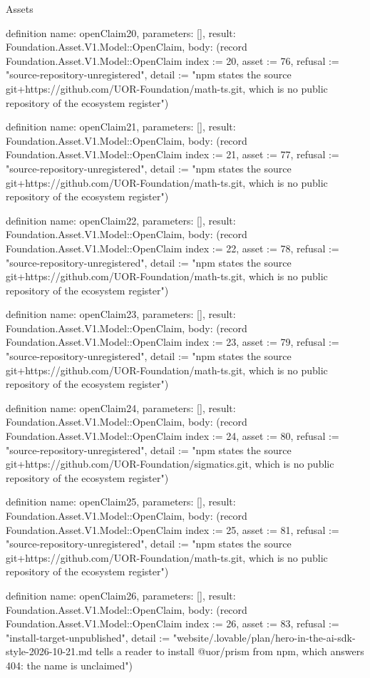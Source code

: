 \begin{lexlean}{Assets}
\begin{semanticmodule}
definition{
  name: openClaim20,
  parameters: [],
  result: Foundation.Asset.V1.Model::OpenClaim,
  body: (record Foundation.Asset.V1.Model::OpenClaim {index := 20, asset := 76, refusal := "source-repository-unregistered", detail := "npm states the source git+https://github.com/UOR-Foundation/math-ts.git, which is no public repository of the ecosystem register"})
}

definition{
  name: openClaim21,
  parameters: [],
  result: Foundation.Asset.V1.Model::OpenClaim,
  body: (record Foundation.Asset.V1.Model::OpenClaim {index := 21, asset := 77, refusal := "source-repository-unregistered", detail := "npm states the source git+https://github.com/UOR-Foundation/math-ts.git, which is no public repository of the ecosystem register"})
}

definition{
  name: openClaim22,
  parameters: [],
  result: Foundation.Asset.V1.Model::OpenClaim,
  body: (record Foundation.Asset.V1.Model::OpenClaim {index := 22, asset := 78, refusal := "source-repository-unregistered", detail := "npm states the source git+https://github.com/UOR-Foundation/math-ts.git, which is no public repository of the ecosystem register"})
}

definition{
  name: openClaim23,
  parameters: [],
  result: Foundation.Asset.V1.Model::OpenClaim,
  body: (record Foundation.Asset.V1.Model::OpenClaim {index := 23, asset := 79, refusal := "source-repository-unregistered", detail := "npm states the source git+https://github.com/UOR-Foundation/math-ts.git, which is no public repository of the ecosystem register"})
}

definition{
  name: openClaim24,
  parameters: [],
  result: Foundation.Asset.V1.Model::OpenClaim,
  body: (record Foundation.Asset.V1.Model::OpenClaim {index := 24, asset := 80, refusal := "source-repository-unregistered", detail := "npm states the source git+https://github.com/UOR-Foundation/sigmatics.git, which is no public repository of the ecosystem register"})
}

definition{
  name: openClaim25,
  parameters: [],
  result: Foundation.Asset.V1.Model::OpenClaim,
  body: (record Foundation.Asset.V1.Model::OpenClaim {index := 25, asset := 81, refusal := "source-repository-unregistered", detail := "npm states the source git+https://github.com/UOR-Foundation/math-ts.git, which is no public repository of the ecosystem register"})
}

definition{
  name: openClaim26,
  parameters: [],
  result: Foundation.Asset.V1.Model::OpenClaim,
  body: (record Foundation.Asset.V1.Model::OpenClaim {index := 26, asset := 83, refusal := "install-target-unpublished", detail := "website/.lovable/plan/hero-in-the-ai-sdk-style-2026-10-21.md tells a reader to install @uor/prism from npm, which answers 404: the name is unclaimed"})
}


\end{semanticmodule}
\end{lexlean}
